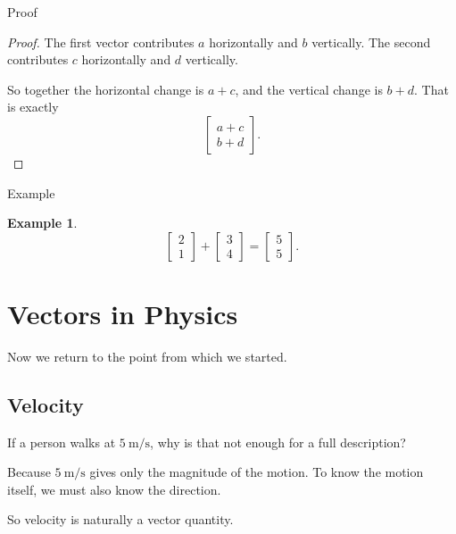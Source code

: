 \documentclass[11pt,a4paper]{article}
\newtheorem{example}[theorem]{Example}
\begin{document}
\begin{mathblock}{Proof}
\begin{proof}
The first vector contributes \(a\) horizontally and \(b\) vertically.
The second contributes \(c\) horizontally and \(d\) vertically.

So together the horizontal change is \(a+c\), and the vertical change is \(b+d\).
That is exactly
\[
\begin{bmatrix}
a+c \\ b+d
\end{bmatrix}.
\]
\end{proof}
\end{mathblock}

\begin{mathblock}{Example}
\begin{example}
\[
\begin{bmatrix}
2 \\ 1
\end{bmatrix}
+
\begin{bmatrix}
3 \\ 4
\end{bmatrix}
=
\begin{bmatrix}
5 \\ 5
\end{bmatrix}.
\]
\end{example}
\end{mathblock}

\section{Vectors in Physics}

Now we return to the point from which we started.

\subsection{Velocity}

\begin{problemblock}
If a person walks at \(5\ \mathrm{m/s}\), why is that not enough for a full description?
\end{problemblock}

\begin{solutionblock}
Because \(5\ \mathrm{m/s}\) gives only the magnitude of the motion.
To know the motion itself, we must also know the direction.

So velocity is naturally a vector quantity.
\end{solutionblock}
\end{document}
